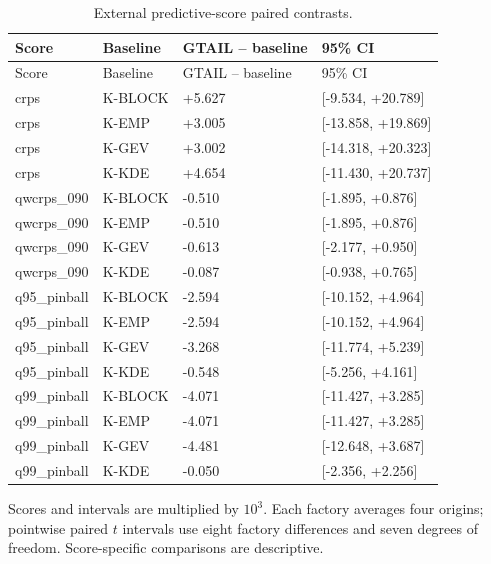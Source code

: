\begingroup
\fontsize{8.5}{10.5}\selectfont\setlength{\tabcolsep}{3pt}
\begin{longtable}{@{}llll@{}}
\caption{External predictive-score paired contrasts.}\label{tab:final-si-9}\\
\toprule
Score & Baseline & GTAIL -- baseline & 95\% CI\\\midrule\endfirsthead
Score & Baseline & GTAIL -- baseline & 95\% CI\\\midrule\endhead
crps & K-BLOCK & +5.627 & [-9.534, +20.789]\\
crps & K-EMP & +3.005 & [-13.858, +19.869]\\
crps & K-GEV & +3.002 & [-14.318, +20.323]\\
crps & K-KDE & +4.654 & [-11.430, +20.737]\\
qwcrps\_090 & K-BLOCK & -0.510 & [-1.895, +0.876]\\
qwcrps\_090 & K-EMP & -0.510 & [-1.895, +0.876]\\
qwcrps\_090 & K-GEV & -0.613 & [-2.177, +0.950]\\
qwcrps\_090 & K-KDE & -0.087 & [-0.938, +0.765]\\
q95\_pinball & K-BLOCK & -2.594 & [-10.152, +4.964]\\
q95\_pinball & K-EMP & -2.594 & [-10.152, +4.964]\\
q95\_pinball & K-GEV & -3.268 & [-11.774, +5.239]\\
q95\_pinball & K-KDE & -0.548 & [-5.256, +4.161]\\
q99\_pinball & K-BLOCK & -4.071 & [-11.427, +3.285]\\
q99\_pinball & K-EMP & -4.071 & [-11.427, +3.285]\\
q99\_pinball & K-GEV & -4.481 & [-12.648, +3.687]\\
q99\_pinball & K-KDE & -0.050 & [-2.356, +2.256]\\
\bottomrule
\end{longtable}
\noindent\footnotesize Scores and intervals are multiplied by $10^3$. Each factory averages four origins; pointwise paired $t$ intervals use eight factory differences and seven degrees of freedom. Score-specific comparisons are descriptive.
\endgroup
